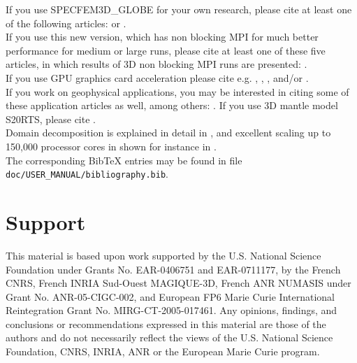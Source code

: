 \documentclass[oneside,english]{book}
\begin{document}
If you use SPECFEM3D\_GLOBE for your own research, please cite at least one
of the following articles: \cite{TrKoLi08,PeKoLuMaLeCaLeMaLiBlNiBaTr11,VaCaSaKoVi99,LeChLiKoHuTr08,LeChKoHuTr09,LeKoHuTr09,KoMiEr09,KoErGoMi10,WiKoScTr04,KoLiTrSuStSh04,ChKoViCaVaFe07,MaKoDi09,KoViCh10,CaKoLaTiMiLeSnTr08,TrKoHjLiZhPeBoMcFrTrHu10,KoRiTr02,KoTr02a,KoTr02b,KoTr99} or \cite{KoVi98}.\\

If you use this new version, which has non blocking MPI for much better performance for medium or large runs,
please cite at least one of these five articles,
in which results of 3D non blocking MPI runs are presented: \cite{KoErGoMi10,KoViCh10,Kom11,PeKoLuMaLeCaLeMaLiBlNiBaTr11,CaKoLaTiMiLeSnTr08}.\\

If you use GPU graphics card acceleration please cite e.g. \cite{Kom11}, \cite{MiKo10}, \cite{KoMiEr09}, and/or \cite{KoErGoMi10}.\\

If you work on geophysical applications, you may be interested in citing some of these application articles as well, among others:
\cite{WiKoScTr04,JiTsKoTr05,KrJiKoTr06a,KrJiKoTr06b,LeChLiKoHuTr08,LeChKoHuTr09,LeKoHuTr09,ChFaKo04,FaChKo04,RiRiKoTrHe02,GoAmTaCaSmSaMaKo09,TrKo00,SaKoTr10}.
If you use 3D mantle model S20RTS, please cite \citet{RiVaWo99}.\\

Domain decomposition is explained in detail in \cite{MaKoBlLe08}, and excellent scaling up to 150,000 processor cores in shown for instance in
\cite{CaKoLaTiMiLeSnTr08,KoLaMi08a,MaKoBlLe08,KoErGoMi10,Kom11}.\\

The corresponding Bib\TeX{} entries may be found
in file \texttt{doc/USER\_MANUAL/bibliography.bib}.

\section{Support}

This material is based upon work supported by the U.S. National Science
Foundation under Grants No. EAR-0406751 and EAR-0711177, by the French
CNRS, French INRIA Sud-Ouest MAGIQUE-3D, French ANR NUMASIS under
Grant No. ANR-05-CIGC-002, and European FP6 Marie Curie International
Reintegration Grant No. MIRG-CT-2005-017461.
Any opinions, findings, and conclusions or recommendations expressed in this material are
those of the authors and do not necessarily reflect the views of the
U.S. National Science Foundation, CNRS, INRIA, ANR or the European
Marie Curie program.
\end{document}
